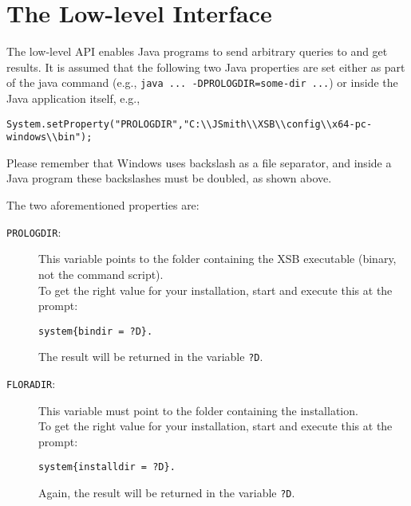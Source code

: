 \section{The Low-level Interface} \label{sec-java-lowlevel}
 The low-level API enables Java programs to send arbitrary queries
to \FLSYSTEM and get results. 
It is assumed that the following two Java properties
are set either as part of the java command (e.g.,  \texttt{java
  ... -DPROLOGDIR=some-dir ...}) or inside the Java application itself, e.g.,
\begin{verbatim}
System.setProperty("PROLOGDIR","C:\\JSmith\\XSB\\config\\x64-pc-windows\\bin");
\end{verbatim}
Please remember that Windows uses backslash as a file separator, and inside a
Java program these backslashes must be doubled, as shown above.

The two aforementioned properties are:
\begin{description}
\item[\texttt{PROLOGDIR}:] 
This variable points to the folder
containing the XSB executable (binary, not the command script).
\\
To get the right value for your installation, start
\FLSYSTEM and execute this at the prompt:
\begin{verbatim}
system{bindir = ?D}.
\end{verbatim}
The result will be returned in the variable \texttt{?D}. 

\item[{\tt FLORADIR}:]
\label{page-floradir}
  This variable must point to the folder
containing the \FLSYSTEM installation.
\\
To get the right value for your installation, start
\FLSYSTEM and execute this at the prompt:
\begin{verbatim}
system{installdir = ?D}.
\end{verbatim}
Again, the result will be returned in the variable \texttt{?D}. 
\end{description}

\bigskip

